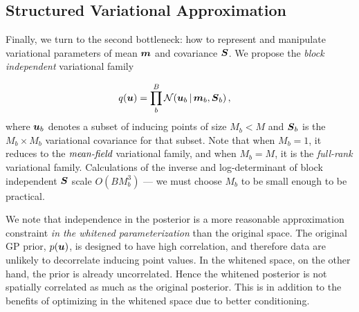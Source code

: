 \subsection{Structured Variational Approximation}
\label{sec:variational-families}
Finally, we turn to the second bottleneck: how to represent
and manipulate variational parameters of mean $\boldsymbol{m}$ and covariance $\boldsymbol{S}$.
We propose the \emph{block independent} variational family
\iffalse
\begin{align}
  q(\bu) &= \prod_{m}^M \mathcal{N}(\bu_{m} \given \bm_{m}, \bs^2_m) \,,
\end{align}
\fi
\begin{align}
  q(\boldsymbol{u}) &= \prod_{b}^B \mathcal{N}(\boldsymbol{u}_{b} \,|\, \boldsymbol{m}_{b}, \boldsymbol{S}_{b}) \,,
  \label{eq:block-cov}
\end{align}
where $\boldsymbol{u}_{b}$ denotes a subset of inducing points of size $M_b < M$
and $\boldsymbol{S}_b$ is the $M_b \times M_b$ variational covariance for that
subset. Note that when $M_b=1$, it reduces to the $\emph{mean-field}$ variational family,
and when $M_b = M$, it is the \emph{full-rank} variational family.
Calculations of the inverse and log-determinant of block independent $\boldsymbol{S}$ scale $O(B M_b^3)$
--- we must choose $M_b$ to be small enough to be practical.


We note that independence in the posterior is a more reasonable approximation
constraint \emph{in the whitened parameterization} than the original space.
The original GP prior, $p(\boldsymbol{u})$, is designed to have high correlation, and therefore
data are unlikely to decorrelate inducing point values.
In the whitened space, on the other hand, the prior is already uncorrelated.
Hence the whitened posterior
is not spatially correlated as much as the original posterior.
This is in addition to the benefits of optimizing in the whitened space
due to better conditioning.

